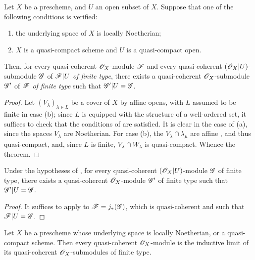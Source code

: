 \begin{theorem}[9.4.7]
\label{1.9.4.7}
Let $X$ be a prescheme, and $U$ an open subset of $X$. Suppose that one of the following
conditions is verified:
\begin{enumerate}[label=\emph{(\alph*)}]
  \item the underlying space of $X$ is locally Noetherian;
  \item $X$ is a quasi-compact scheme and $U$ is a quasi-compact open.
\end{enumerate}
Then, for every quasi-coherent $\mathscr{O}_X$-module $\mathscr{F}$ and every quasi-coherent
$(\mathscr{O}_X|U)$-submodule $\mathscr{G}$ of $\mathscr{F}|U$ \emph{of finite type}, there exists a
quasi-coherent $\mathscr{O}_X$-submodule $\mathscr{G}'$ of $\mathscr{F}$ \emph{of finite type} such that
$\mathscr{G}'|U=\mathscr{G}$.
\end{theorem}

\begin{proof}
\label{proof-1.9.4.7}
Let
$(V_\lambda)_{\lambda\in L}$ be a cover of $X$ by affine opens, with $L$ assumed to be finite
in case (b); since $L$ is equipped with the structure of a well-ordered set, it suffices to
check that the conditions of  are satisfied. It is clear in the case of (a),
since the spaces $V_\lambda$ are Noetherian. For case (b), the $V_\lambda\cap\lambda_\mu$ are
affine , and thus quasi-compact, and, since $L$ is finite,
$V_\lambda\cap W_\lambda$ is quasi-compact. Whence the theorem.
\end{proof}

\begin{corollary}[9.4.8]
\label{1.9.4.8}
Under the hypotheses of , for every quasi-coherent $(\mathscr{O}_X|U)$-module
$\mathscr{G}$ of finite type, there exists a quasi-coherent $\mathscr{O}_X$-module $\mathscr{G}'$ of finite
type such that $\mathscr{G}'|U=\mathscr{G}$.
\end{corollary}

\begin{proof}
\label{proof-1.9.4.8}
It suffices to apply  to $\mathscr{F}=j_*(\mathscr{G})$, which is quasi-coherent
 and such that $\mathscr{F}|U=\mathscr{G}$.
\end{proof}

\begin{corollary}[9.4.9]
\label{1.9.4.9}
Let $X$ be a prescheme whose underlying space is locally Noetherian, or a quasi-compact
scheme. Then every quasi-coherent $\mathscr{O}_X$-module is the inductive limit of its quasi-coherent
$\mathscr{O}_X$-submodules of finite type.
\end{corollary}

